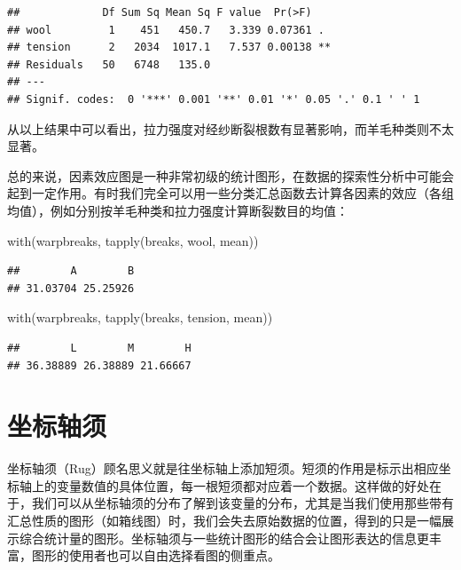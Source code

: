 \documentclass[
  b5paper,
  UTF8,twoside]{book}
\newenvironment{Shaded}{\begin{snugshade}}{\end{snugshade}}
\newcommand{\FunctionTok}[1]{\textcolor[rgb]{0.00,0.00,0.00}{#1}}
\newcommand{\NormalTok}[1]{#1}
\begin{document}
\begin{verbatim}
##             Df Sum Sq Mean Sq F value  Pr(>F)   
## wool         1    451   450.7   3.339 0.07361 . 
## tension      2   2034  1017.1   7.537 0.00138 **
## Residuals   50   6748   135.0                   
## ---
## Signif. codes:  0 '***' 0.001 '**' 0.01 '*' 0.05 '.' 0.1 ' ' 1
\end{verbatim}

从以上结果中可以看出，拉力强度对经纱断裂根数有显著影响，而羊毛种类则不太显著。

总的来说，因素效应图是一种非常初级的统计图形，在数据的探索性分析中可能会起到一定作用。有时我们完全可以用一些分类汇总函数去计算各因素的效应（各组均值），例如分别按羊毛种类和拉力强度计算断裂数目的均值：

\begin{Shaded}
\begin{Highlighting}[]
\FunctionTok{with}\NormalTok{(warpbreaks, }\FunctionTok{tapply}\NormalTok{(breaks, wool, mean))}
\end{Highlighting}
\end{Shaded}

\begin{verbatim}
##        A        B 
## 31.03704 25.25926
\end{verbatim}

\begin{Shaded}
\begin{Highlighting}[]
\FunctionTok{with}\NormalTok{(warpbreaks, }\FunctionTok{tapply}\NormalTok{(breaks, tension, mean))}
\end{Highlighting}
\end{Shaded}

\begin{verbatim}
##        L        M        H 
## 36.38889 26.38889 21.66667
\end{verbatim}

\hypertarget{sec:rug}{%
\section{坐标轴须}\label{sec:rug}}

坐标轴须（Rug）顾名思义就是往坐标轴上添加短须。短须的作用是标示出相应坐标轴上的变量数值的具体位置，每一根短须都对应着一个数据。这样做的好处在于，我们可以从坐标轴须的分布了解到该变量的分布，尤其是当我们使用那些带有汇总性质的图形（如箱线图）时，我们会失去原始数据的位置，得到的只是一幅展示综合统计量的图形。坐标轴须与一些统计图形的结合会让图形表达的信息更丰富，图形的使用者也可以自由选择看图的侧重点。
\end{document}
